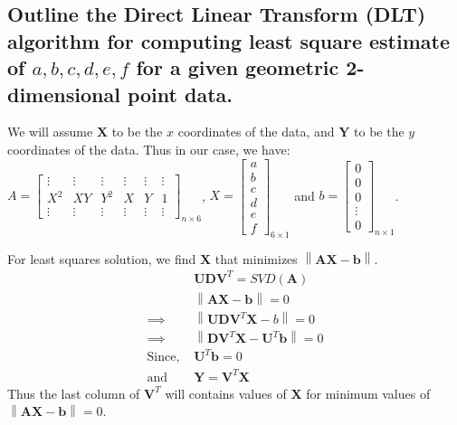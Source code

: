 \documentclass[a4paper]{article}
\begin{document}
\subsection{Outline the Direct Linear Transform (DLT) algorithm for computing least square estimate of $a, b, c, d, e, f$ for a given geometric 2-dimensional point data.}
We will assume $\mathbf{X}$ to be the $x$ coordinates of the data, and $\mathbf{Y}$ to be the $y$ coordinates of the data. Thus in our case, we have:
$A = \begin{bmatrix}
        \vdots & \vdots & \vdots & \vdots & \vdots & \vdots \\
        X^2    & XY     & Y^2    & X      & Y      & 1      \\
        \vdots & \vdots & \vdots & \vdots & \vdots & \vdots
    \end{bmatrix}_{n\times 6}$,
$X = \begin{bmatrix}
        a \\b\\c\\d\\e\\f
    \end{bmatrix}_{6\times 1}$ and
$b = \begin{bmatrix}
        0 \\0\\0\\\vdots\\0
    \end{bmatrix}_{n\times 1}$.
\par For least squares solution, we find $\mathbf{X}$ that minimizes $\left\lVert \mathbf{A}\mathbf{X} - \mathbf{b}\right\rVert$.
\begin{align*}
                   & \mathbf{U} \mathbf{D}\mathbf{V}^T = SVD(\mathbf{A})                                     \\
                   & \left\lVert \mathbf{A}\mathbf{X}-\mathbf{b}\right\rVert = 0                             \\
    \implies       & \left\lVert \mathbf{U} \mathbf{D}\mathbf{V}^T\mathbf{X}-b \right\rVert=0                \\
    \implies       & \left\lVert \mathbf{D}\mathbf{V}^T \mathbf{X} - \mathbf{U}^T \mathbf{b}\right\rVert = 0 \\
    \text{Since, } & \mathbf{U}^T \mathbf{b} = 0                                                             \\
    \text{and }    & \mathbf{Y} = \mathbf{V}^T \mathbf{X}
\end{align*}
Thus the last column of $\mathbf{V}^T$ will contains values of $\mathbf{X}$ for minimum values of $\left\lVert \mathbf{A}\mathbf{X}-\mathbf{b}\right\rVert = 0$.
\end{document}
